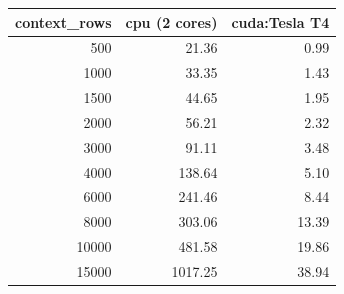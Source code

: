 \begin{tabular}{rrr}
\toprule
context_rows & cpu (2 cores) & cuda:Tesla T4 \\
\midrule
500 & 21.36 & 0.99 \\
1000 & 33.35 & 1.43 \\
1500 & 44.65 & 1.95 \\
2000 & 56.21 & 2.32 \\
3000 & 91.11 & 3.48 \\
4000 & 138.64 & 5.10 \\
6000 & 241.46 & 8.44 \\
8000 & 303.06 & 13.39 \\
10000 & 481.58 & 19.86 \\
15000 & 1017.25 & 38.94 \\
\bottomrule
\end{tabular}
